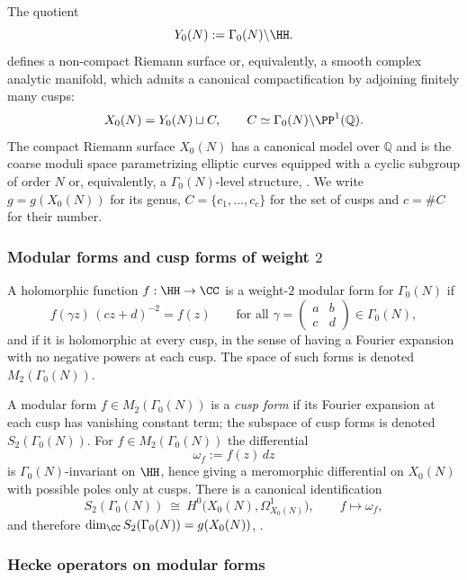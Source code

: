 \documentclass[10pt]{amsart}
\theoremstyle{theostyle}
\newcommand{\QQ}{\mathbb{Q}} \newcommand{\RR}{\mathbb{R}}
\newcommand{\ZZ}{\mathbb{Z}}
\begin{document}
The quotient
\[
Y_0(N):=\Gamma_0(N)\backslash\HH.
\]
defines a non-compact Riemann surface or, equivalently, a smooth complex analytic
manifold, which admits a canonical compactification by adjoining finitely
many cusps:
\[
X_0(N)=Y_0(N)\sqcup C,
\qquad
C\simeq \Gamma_0(N)\backslash\PP^1(\QQ).
\]
The compact Riemann surface $X_0(N)$ has a canonical model over $\QQ$ \cite[\S7]{Milne:Modular} and is
the coarse moduli space parametrizing elliptic curves equipped with a cyclic
subgroup of order $N$ or, equivalently, a $\Gamma_0(N)$-level structure, \cite{DeligneRap:Schemas}.
We write $g=g(X_0(N))$ for its genus, $C=\{c_1,\dots,c_c\}$ for the set of cusps and $c=\#C$ for their number.



\subsubsection*{Modular forms and cusp forms of weight $2$}

A holomorphic function $f:\HH\to\CC$ is a weight-$2$ modular form for
$\Gamma_0(N)$ if
\[
f(\gamma z)\,(cz+d)^{-2}=f(z)
\qquad\text{for all }\gamma=\begin{pmatrix}a&b\\c&d\end{pmatrix}\in\Gamma_0(N),
\]
and if it is holomorphic at every cusp, in the sense of having a Fourier
expansion with no negative powers at each cusp. The space of such forms is denoted
$M_2(\Gamma_0(N))$.

A modular form $f\in M_2(\Gamma_0(N))$ is a \emph{cusp form} if its Fourier
expansion at each cusp has vanishing constant term; the subspace of cusp forms
is denoted $S_2(\Gamma_0(N))$.
For $f\in M_2(\Gamma_0(N))$ the differential
\[
\omega_f := f(z)\,dz
\]
is $\Gamma_0(N)$-invariant on $\HH$, hence giving a meromorphic differential
on $X_0(N)$ with possible poles only at cusps. There is a canonical identification
\[
S_2(\Gamma_0(N))\ \cong\ H^0\!\bigl(X_0(N),\Omega^1_{X_0(N)}\bigr),
\qquad
f\longmapsto \omega_f,
\]
and therefore $\dim_\CC S_2(\Gamma_0(N))=g(X_0(N))$, \cite[Ch. 3]{Wehler:Notes}.

\subsubsection*{Hecke operators on modular forms}
\end{document}
